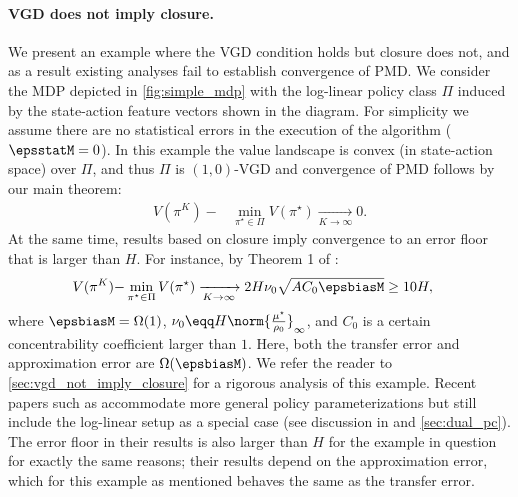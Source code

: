 \paragraph{VGD does not imply closure.}
We present an example where the VGD condition holds but closure does not, and as a result existing analyses fail to establish convergence of PMD.
We consider the MDP depicted in \cref{fig:simple_mdp} 
 with the log-linear policy class $\Pi$ induced by the state-action feature vectors shown in the diagram. 
 For simplicity we assume there are no statistical errors in the execution of the algorithm ($\epsstatM=0$). In this example the value landscape is convex (in state-action space) over $\Pi$, and thus $\Pi$ is $(1,0)$-VGD and convergence of PMD follows by our main theorem:
\begin{align*}
        V(\pi^{K}) - &\min_{\pi^\star\in \Pi}V(\pi^\star)
        \xrightarrow[K\to \infty]{} 0.
    \end{align*}
At the same time, results based on closure imply convergence to an error floor that is larger than $H$.
For instance, by Theorem 1 of \citet{yuan2023loglinear}:
\begin{align*}
        V(\pi^{K}) - &\min_{\pi^\star\in \Pi}V(\pi^\star)
        \xrightarrow[K\to \infty]{}
        2H \nu_0 \sqrt{A C_0 \epsbiasM}
        \geq 10 H,
    \end{align*}
    where $\epsbiasM=\Omega(1)$, $\nu_0 \eqq H\norm{\frac{\mu^\star}{\rho_0}}_\infty$, and $C_0$ is a certain concentrability coefficient larger than $1$. Here, both the transfer error and approximation error are $\Omega(\epsbiasM)$.
We refer the reader to \cref{sec:vgd_not_imply_closure} for a  rigorous analysis of this example.
Recent papers such as \citet{alfano2023novel,xiong2024dual} accommodate more general policy parameterizations but still include
the log-linear setup as a special case (see discussion in \citealp{alfano2023novel} and \cref{sec:dual_pc}). The error floor in their results is also larger than $H$ for the example in question for exactly the same reasons; their results depend on the approximation error, which for this example as mentioned behaves the same as the transfer error.

